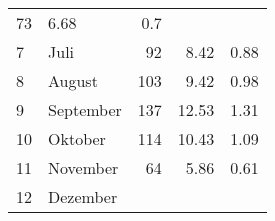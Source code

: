 \begin{longtable}{lXrrr}
       \num{73} &
       \num[round-mode=places,round-precision=2]{6.68} &
         \num[round-mode=places,round-precision=2]{0.7} \\

     7 &
     \multicolumn{1}{X}{ Juli   } &


       \num{92} &
       \num[round-mode=places,round-precision=2]{8.42} &
         \num[round-mode=places,round-precision=2]{0.88} \\

     8 &
     \multicolumn{1}{X}{ August   } &


       \num{103} &
       \num[round-mode=places,round-precision=2]{9.42} &
         \num[round-mode=places,round-precision=2]{0.98} \\

     9 &
     \multicolumn{1}{X}{ September   } &


       \num{137} &
       \num[round-mode=places,round-precision=2]{12.53} &
         \num[round-mode=places,round-precision=2]{1.31} \\

     10 &
     \multicolumn{1}{X}{ Oktober   } &


       \num{114} &
       \num[round-mode=places,round-precision=2]{10.43} &
         \num[round-mode=places,round-precision=2]{1.09} \\

     11 &
     \multicolumn{1}{X}{ November   } &


       \num{64} &
       \num[round-mode=places,round-precision=2]{5.86} &
         \num[round-mode=places,round-precision=2]{0.61} \\

     12 &
     \multicolumn{1}{X}{ Dezember   } &



\end{longtable}
